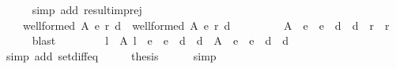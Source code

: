 \begin{isabellebody}
\ \ \ \ \isamarkupfalse%
\ {\isacharparenleft}{\kern0pt}simp\ add{\isacharcolon}{\kern0pt}\ result{\isacharunderscore}{\kern0pt}imp{\isacharunderscore}{\kern0pt}rej{\isacharparenright}{\kern0pt}\isanewline
\ \ \isamarkupfalse%
\ \isamarkupfalse%
\isanewline
\ \ \ \ {\isachardoublequoteopen}{\isacharparenleft}{\kern0pt}well{\isacharunderscore}{\kern0pt}formed\ A\ {\isacharparenleft}{\kern0pt}e{}{\isacharcomma}{\kern0pt}\ r{}{\isacharcomma}{\kern0pt}\ d{}{\isacharparenright}{\kern0pt}\ {\isasymand}\ well{\isacharunderscore}{\kern0pt}formed\ A\ {\isacharparenleft}{\kern0pt}e{}{\isacharcomma}{\kern0pt}\ r{}{\isacharcomma}{\kern0pt}\ d{}{\isacharparenright}{\kern0pt}{\isacharparenright}{\kern0pt}\ {\isasymlongrightarrow}\isanewline
\ \ \ \ \ \ \ \ A\ {\isacharminus}{\kern0pt}\ {\isacharparenleft}{\kern0pt}e{}\ {\isasymunion}\ e{}\ {\isasymunion}\ d{}\ {\isasymunion}\ d{}{\isacharparenright}{\kern0pt}\ {\isacharequal}{\kern0pt}\ r{}\ {\isasyminter}\ r{}{\isachardoublequoteclose}\isanewline
\ \ \ \ \isamarkupfalse%
\ blast\isanewline
\ \ \isamarkupfalse%
\ \isamarkupfalse%
\isanewline
\ \ \ \ {\isachardoublequoteopen}{\isacharbraceleft}{\kern0pt}l\ {\isasymin}\ A{\isachardot}{\kern0pt}\ l\ {\isasymnotin}\ e{}\ {\isasymunion}\ e{}\ {\isasymunion}\ d{}\ {\isasymunion}\ d{}{\isacharbraceright}{\kern0pt}\ {\isacharequal}{\kern0pt}\ A\ {\isacharminus}{\kern0pt}\ {\isacharparenleft}{\kern0pt}e{}\ {\isasymunion}\ e{}\ {\isasymunion}\ d{}\ {\isasymunion}\ d{}{\isacharparenright}{\kern0pt}{\isachardoublequoteclose}\isanewline
\ \ \ \ \isamarkupfalse%
\ {\isacharparenleft}{\kern0pt}simp\ add{\isacharcolon}{\kern0pt}\ set{\isacharunderscore}{\kern0pt}diff{\isacharunderscore}{\kern0pt}eq{\isacharparenright}{\kern0pt}\isanewline
\ \ \isamarkupfalse%
\ \isamarkupfalse%
\ {\isacharquery}{\kern0pt}thesis\isanewline
\ \ \ \ \isamarkupfalse%
\ simp\isanewline
{}\isamarkupfalse%
%
\endisatagproof
{\isafoldproof}%
%
\isadelimproof
%
\endisadelimproof
%
\isadelimdocument
%
\endisadelimdocument
%
\isatagdocument
%
\isamarkuptrue%
%
\endisatagdocument
{\isafolddocument}%
%
\isadelimdocument
%
\endisadelimdocument
{}\isamarkupfalse%

\end{isabellebody}
